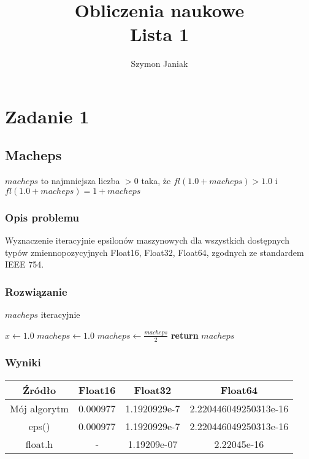 \documentclass{article}
\title{%
	Obliczenia naukowe \\
	\large Lista 1}
\author{Szymon Janiak}
\begin{document}
\maketitle

\section{Zadanie 1}
\subsection{Macheps}
	$macheps$ to najmniejsza liczba $> 0$ taka, że $fl(1.0 + macheps) > 1.0$ i $fl(1.0 + macheps) = 1 + macheps$
\subsubsection{Opis problemu}
	Wyznaczenie iteracyjnie epsilonów maszynowych dla wszystkich dostępnych typów zmiennopozycyjnych Float16, Float32, Float64, zgodnych ze standardem IEEE 754.
\subsubsection{Rozwiązanie}
	\begin{algorithm}
	\caption{$macheps$ iteracyjnie}\label{alg:cap}
	\begin{algorithmic}
        \State $x \gets 1.0$
        \State $macheps \gets 1.0$
            \State $macheps \gets \frac{macheps}{2}$
        \EndWhile
        \State \textbf{return} $macheps$
    \end{algorithmic}
    \end{algorithm}
\subsubsection{Wyniki}
	\begin{center}
        \begin{tabular}{|c||c|c|c|}
        \hline
            Źródło & Float16 & Float32 & Float64 \\
            \hline\hline
            Mój algorytm & 0.000977 & 1.1920929e-7 & 2.220446049250313e-16\\
            \hline
            eps() & 0.000977 & 1.1920929e-7 & 2.220446049250313e-16\\
            \hline
            float.h & - & 1.19209e-07 & 2.22045e-16 \\
        \hline
        \end{tabular}
    \end{center}
\end{document}
